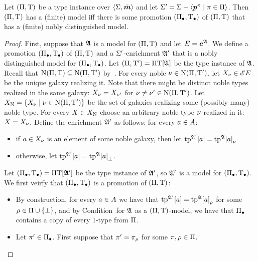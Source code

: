\begin{lemma}\label{lem:noble-distinguishability}
Let $(\Pi,\mathrm{T})$ be a type instance over $\left\langle \mathrm{\Sigma},\bar{\bm{m}} \right\rangle$ and let
$\mathrm{\Sigma'} = \mathrm{\Sigma} + \left\langle \bm{p}^{\pi} \mathrel{}\middle|\mathrel{} \pi \in \Pi \right\rangle$.
Then $(\Pi,\mathrm{T})$ has a (finite) model iff there is some promotion
$(\Pi_{\bullet},\mathrm{T}_{\bullet})$ of $(\Pi,\mathrm{T})$ that has a (finite) nobly distinguished
model.
\end{lemma}
\begin{proof}
First, suppose that $\mathfrak{A}$ is a model for $(\Pi,\mathrm{T})$ and let $E
= \bm{e}^{\mathfrak{A}}$.
We define a promotion $(\Pi_{\bullet},\mathrm{T}_{\bullet})$ of $(\Pi,\mathrm{T})$ and
a $\mathrm{\Sigma'}$-enrichment $\mathfrak{A'}$ that is a nobly distinguished model for
$(\Pi_{\bullet},\mathrm{T}_{\bullet})$.
Let $(\Pi,{\mathrm{T}'}) = \Pi\mathrm{T}[\mathfrak{A}]$ be the type instance of $\mathfrak{A}$.
Recall that $\mathrm{\mathrm{N}}(\Pi,\mathrm{T}) \subseteq
\mathrm{\mathrm{N}}(\Pi,{\mathrm{T}'})$ by~.
For every noble $\nu \in
\mathrm{\mathrm{N}}(\Pi,{\mathrm{T}'})$, let $X_\nu \in {\mathscr{E}E}$ be the unique galaxy realizing it. Note that there might be distinct noble types
realized in the same galaxy: 
$X_\nu = X_{\nu'}$ for $\nu \neq {\nu'} \in \mathrm{\mathrm{N}}(\Pi,{\mathrm{T}'})$.
Let $X_{\mathrm{\mathrm{N}}} = \left\{X_\nu\mathrel{}\middle|\mathrel{}\nu \in \mathrm{\mathrm{N}}(\Pi,{\mathrm{T}'})\right\}$ be the set of
galaxies realizing some (possibly many) noble type. For every $X \in
X_{\mathrm{\mathrm{N}}}$ choose an arbitrary noble type $\nu$ realized in it: $X =
X_\nu$.
Define the enrichment $\mathfrak{A'}$ as follows: for every $a \in A$:
\begin{itemize}
  \item if $a \in X_\nu$ is an element of some noble galaxy, then let
$\operatorname{tp}^{\mathfrak{A'}}[a] = {\operatorname{tp}^{\mathfrak{A}}[a]}_{\nu}$
  \item otherwise, let $\operatorname{tp}^{\mathfrak{A'}}[a] = {\operatorname{tp}^{\mathfrak{A}}[a]}_{\bot}$.
\end{itemize}
Let $(\Pi_{\bullet},\mathrm{T}_{\bullet}) = \Pi\mathrm{T}[\mathfrak{A'}]$ be the type instance of $\mathfrak{A'}$, so
$\mathfrak{A'}$ is a model for $(\Pi_{\bullet},\mathrm{T}_{\bullet})$. We first veirfy that
$(\Pi_{\bullet},\mathrm{T}_{\bullet})$ is a promotion of $(\Pi,\mathrm{T})$:
\begin{itemize}
  \item[\refcondpromp]
  By construction, for every $a \in A$ we have that
  $\operatorname{tp}^{\mathfrak{A'}}[a] = {\operatorname{tp}^{\mathfrak{A}}[a]}_{\rho}$ for some $\rho \in
  \Pi\cup\left\{\bot\right\}$, and by Condition~ for $\mathfrak{A}$ as a
  $(\Pi,\mathrm{T})$-model, we have that $\Pi_{\bullet}$ contains a copy of every
  $1$-type from $\Pi$.
  \item[\refcondpromn]
  Let ${\pi'} \in \Pi_{\bullet}$.
  First suppose that ${\pi'} = {\pi}_{\rho}$ for some $\pi, \rho \in \Pi$.

\end{itemize}
\end{proof}
